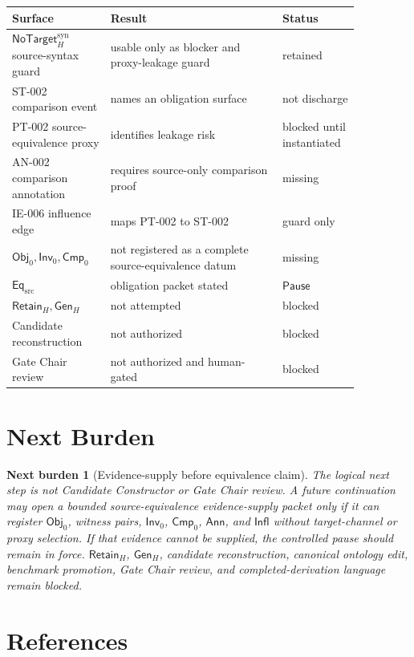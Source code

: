 \documentclass[11pt]{article}
\newcommand{\Obj}{\mathsf{Obj}_{0}}
\newcommand{\Inv}{\mathsf{Inv}_{0}}
\newcommand{\Cmp}{\mathsf{Cmp}_{0}}
\newcommand{\EqSrc}{\mathsf{Eq}_{\mathrm{src}}}
\newcommand{\GenH}{\mathsf{Gen}_{H}}
\newcommand{\RetainH}{\mathsf{Retain}_{H}}
\newcommand{\NoTargetSyn}{\mathsf{NoTarget}_{H}^{\mathrm{syn}}}
\newcommand{\Annot}{\mathsf{Ann}}
\newcommand{\Influence}{\mathsf{Infl}}
\newcommand{\Pause}{\mathsf{Pause}}
\newtheorem{nextburden}{Next burden}
\begin{document}
\begin{center}
\begin{tabular}{p{0.24\linewidth}p{0.44\linewidth}p{0.18\linewidth}}
\textbf{Surface} & \textbf{Result} & \textbf{Status} \\
\hline
\(\NoTargetSyn\) source-syntax guard & usable only as blocker and proxy-leakage guard & retained \\
ST-002 comparison event & names an obligation surface & not discharge \\
PT-002 source-equivalence proxy & identifies leakage risk & blocked until instantiated \\
AN-002 comparison annotation & requires source-only comparison proof & missing \\
IE-006 influence edge & maps PT-002 to ST-002 & guard only \\
\(\Obj,\Inv,\Cmp\) & not registered as a complete source-equivalence datum & missing \\
\(\EqSrc\) & obligation packet stated & \(\Pause\) \\
\(\RetainH,\GenH\) & not attempted & blocked \\
Candidate reconstruction & not authorized & blocked \\
Gate Chair review & not authorized and human-gated & blocked \\
\end{tabular}
\end{center}

\section{Next Burden}

\begin{nextburden}[Evidence-supply before equivalence claim]
The logical next step is not Candidate Constructor or Gate Chair review. A
future continuation may open a bounded source-equivalence evidence-supply
packet only if it can register \(\Obj\), witness pairs, \(\Inv\), \(\Cmp\),
\(\Annot\), and \(\Influence\) without target-channel or proxy selection. If
that evidence cannot be supplied, the controlled pause should remain in
force. \(\RetainH\), \(\GenH\), candidate reconstruction, canonical ontology
edit, benchmark promotion, Gate Chair review, and completed-derivation
language remain blocked.
\end{nextburden}

\section*{References}
\end{document}

